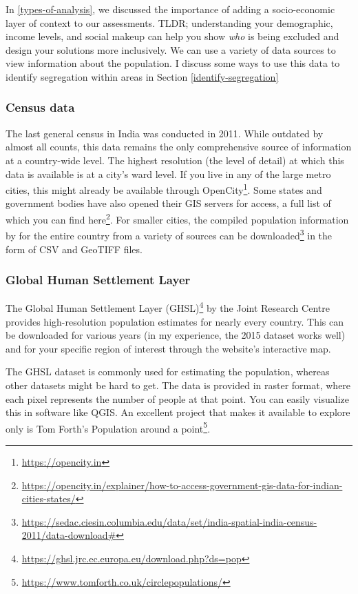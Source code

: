 \documentclass[
]{latex/krantz}
\renewcommand{\href}[2]{#2\footnote{\url{#1}}}
\DeclareRobustCommand{\href}[2]{#2\footnote{\url{#1}}}
\begin{document}
In \ref{types-of-analysis}, we discussed the importance of adding a socio-economic layer of context to our assessments. TLDR; understanding your demographic, income levels, and social makeup can help you show \emph{who} is being excluded and design your solutions more inclusively. We can use a variety of data sources to view information about the population. I discuss some ways to use this data to identify segregation within areas in Section \ref{identify-segregation}

\hypertarget{census-data}{%
\subsubsection*{Census data}\label{census-data}}


The last general census in India was conducted in 2011. While outdated by almost all counts, this data remains the only comprehensive source of information at a country-wide level. The highest resolution (the level of detail) at which this data is available is at a city's ward level. If you live in any of the large metro cities, this might already be available through \href{https://opencity.in}{OpenCity}. Some states and government bodies have also opened their GIS servers for access, a full list of which you can find \href{https://opencity.in/explainer/how-to-access-government-gis-data-for-indian-cities-states/}{here}. For smaller cities, the compiled population information by \autocite{balk2019} for the entire country from a variety of sources can be \href{https://sedac.ciesin.columbia.edu/data/set/india-spatial-india-census-2011/data-download\#}{downloaded} in the form of CSV and GeoTIFF files.

\hypertarget{global-human-settlement-layer}{%
\subsubsection*{Global Human Settlement Layer}\label{global-human-settlement-layer}}


The \href{https://ghsl.jrc.ec.europa.eu/download.php?ds=pop}{Global Human Settlement Layer (GHSL)} by the Joint Research Centre provides high-resolution population estimates for nearly every country. This can be downloaded for various years (in my experience, the 2015 dataset works well) and for your specific region of interest through the website's interactive map.

The GHSL dataset is commonly used for estimating the population, whereas other datasets might be hard to get. The data is provided in raster format, where each pixel represents the number of people at that point. You can easily visualize this in software like QGIS. An excellent project that makes it available to explore only is Tom Forth's \href{https://www.tomforth.co.uk/circlepopulations/}{Population around a point}.
\end{document}
